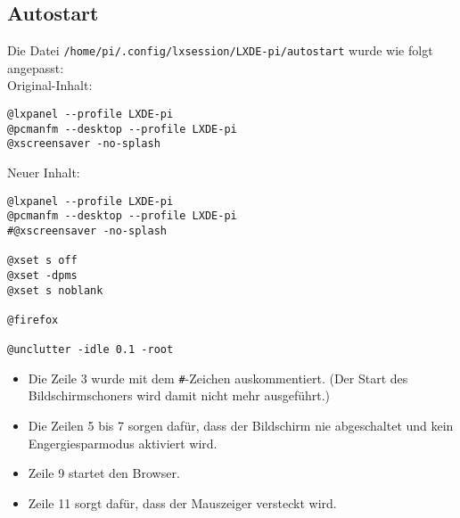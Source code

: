 \subsection{Autostart}
\label{sec:autostartconf}
Die Datei \lstinline|/home/pi/.config/lxsession/LXDE-pi/autostart| wurde wie folgt angepasst:\\
Original-Inhalt:
\begin{lstlisting}
@lxpanel --profile LXDE-pi
@pcmanfm --desktop --profile LXDE-pi
@xscreensaver -no-splash
\end{lstlisting}
Neuer Inhalt:
\begin{lstlisting}
@lxpanel --profile LXDE-pi
@pcmanfm --desktop --profile LXDE-pi
#@xscreensaver -no-splash

@xset s off
@xset -dpms
@xset s noblank

@firefox

@unclutter -idle 0.1 -root
\end{lstlisting}
\begin{itemize}
	\item {Die Zeile 3 wurde mit dem \lstinline|#|-Zeichen auskommentiert. (Der Start des Bildschirmschoners wird damit nicht mehr ausgeführt.)}
	\item {Die Zeilen 5 bis 7 sorgen dafür, dass der Bildschirm nie abgeschaltet und kein Engergiesparmodus aktiviert wird.}
	\item {Zeile 9 startet den Browser.}
	\item {Zeile 11 sorgt dafür, dass der Mauszeiger versteckt wird.}
\end{itemize}

